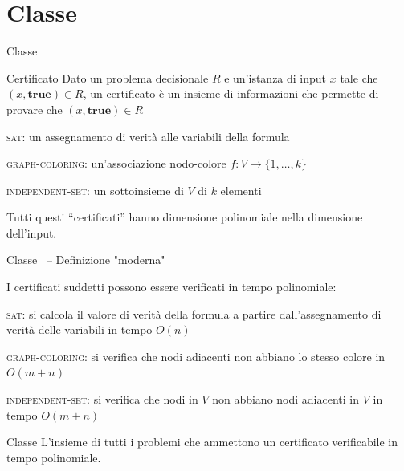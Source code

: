 \section{Classe \NP}
\begin{frame}{Classe \NP}

\vspace{-9pt}
\begin{block}{Certificato}
Dato un problema decisionale $R$ e un'istanza di input $x$ tale
che $(x, \mathbf{true}) \in R$, un \alert{certificato} è un insieme di informazioni che permette di provare che $(x, \mathbf{true}) \in R$
\end{block}

\bigskip
{}
\BIL
\item \textsc{sat}: un assegnamento di verità alle variabili 
  della formula
\item \textsc{graph-coloring}: un'associazione nodo-colore $f: V \rightarrow \{ 1, \ldots, k \}$  
\item \textsc{independent-set}: un sottoinsieme di $V$ di $k$ elementi
\EIL

Tutti questi ``certificati'' hanno dimensione polinomiale nella dimensione dell'input.

\end{frame}

\begin{frame}{Classe \NP\ -- Definizione "moderna"}

I certificati suddetti possono essere verificati in tempo polinomiale:
\BIL
\item \textsc{sat}: si calcola il valore di verità della formula a partire dall'assegnamento di verità delle variabili in tempo $O(n)$
\item \textsc{graph-coloring}: si verifica che nodi adiacenti non abbiano lo stesso
colore in $O(m+n)$
\item \textsc{independent-set}: si verifica che nodi in $V$ non abbiano nodi
adiacenti in $V$ in tempo $O(m+n)$
\EIL

\bigskip
\begin{block}{Classe \NP}
L'insieme di tutti i problemi che ammettono un certificato verificabile
in tempo polinomiale.    
\end{block}

\end{frame}



